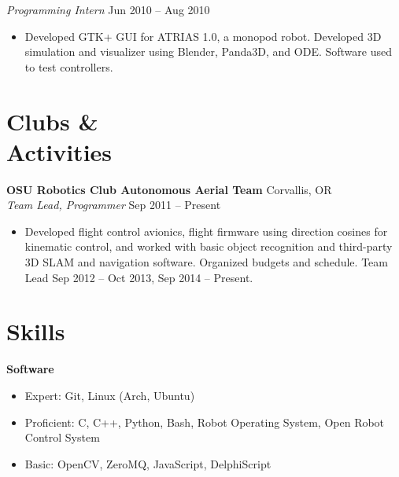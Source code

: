 \documentclass[10pt,letterpaper,margin]{res}
\newcommand{\org}[2]{{\bf #1} \hfill {\color{lightgray} #2} \\}
\newcommand{\pos}[2]{{\it #1} \hfill {\color{lightgray} #2} \vspace{0.0em}}
\begin{document}
\begin{resume}
\pos {Programming Intern} {Jun 2010 -- Aug 2010}

\begin{itemize}
    \item Developed GTK+ GUI for ATRIAS 1.0, a monopod robot. Developed 3D
        simulation and visualizer using Blender, Panda3D, and ODE. Software
        used to test controllers.
\end{itemize}



\section{Clubs \& \\ Activities}

\org {OSU Robotics Club Autonomous Aerial Team} {Corvallis, OR}
\pos {Team Lead, Programmer} {Sep 2011 -- Present}

\begin{itemize}
    \item Developed flight control avionics, flight firmware using direction
      cosines for kinematic control, and worked with basic object recognition
      and third-party 3D SLAM and navigation software. Organized budgets and
      schedule. Team Lead Sep 2012 -- Oct 2013, Sep 2014 -- Present.
\end{itemize}



%
%


\section{Skills}

{\bf Software}\vspace{0.0em}

\begin{itemize}
    \item Expert: \hspace{10pt} Git, Linux (Arch, Ubuntu)
    \item Proficient: C, C++, Python, Bash, Robot Operating System, Open Robot Control System
    \item Basic: \hspace{17pt} OpenCV, ZeroMQ, JavaScript, DelphiScript
\end{itemize}


\end{resume}
\end{document}
